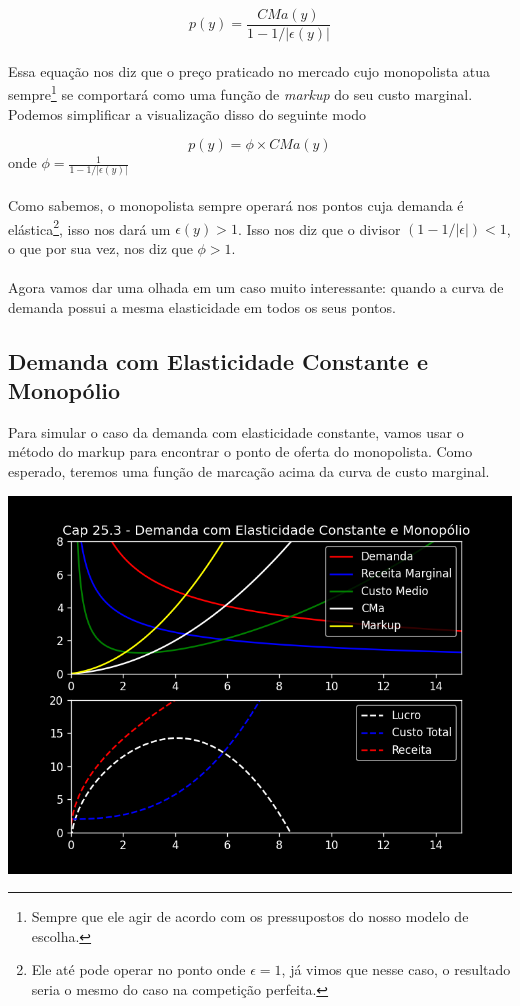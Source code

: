 \documentclass[a4paper,11pt,oneside]{book}
\theoremstyle{definition}
\theoremstyle{break}
\begin{document}
$$ p(y) = \frac{CMa(y)}{1 - 1/|\epsilon(y)|} $$
\\
Essa equação nos diz que o preço praticado no mercado cujo monopolista atua sempre\footnote{Sempre que ele agir de acordo com os pressupostos do nosso modelo de escolha.} se comportará como uma função de \textit{markup} do seu custo marginal. Podemos simplificar a visualização disso do seguinte modo

$$ p(y) = \phi \times CMa(y) $$
onde $\phi = \frac{1}{1 - 1/|\epsilon(y)|}$
\\
\\
Como sabemos, o monopolista sempre operará nos pontos cuja demanda é elástica\footnote{Ele até pode operar no ponto onde $\epsilon = 1$, já vimos que nesse caso, o resultado seria o mesmo do caso na competição perfeita.}, isso nos dará um $\epsilon(y) > 1$. Isso nos diz que o divisor $(1 - 1/|\epsilon|) <  1$, o que por sua vez, nos diz que $\phi > 1$.
\\
\\
Agora vamos dar uma olhada em um caso muito interessante: quando a curva de demanda possui a mesma elasticidade em todos os seus pontos.

\subsection{Demanda com Elasticidade Constante e Monopólio}

Para simular o caso da demanda com elasticidade constante, vamos usar o método do markup para encontrar o ponto de oferta do monopolista. Como esperado, teremos uma função de marcação acima da curva de custo marginal.

\begin{center}
\includegraphics[scale=0.7]{cap25_3-demanda_ces_e_monopolio.png}
\end{center}
\end{document}
